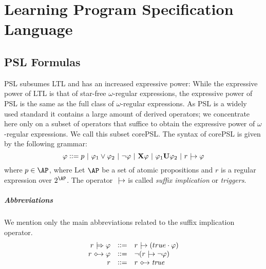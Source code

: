 \chapter{Learning Program Specification Language}

\section{PSL Formulas}
 
PSL subsumes LTL and has an increased expressive power: While the expressive power of LTL is that of star-free $\omega$-regular expressions, the expressive power of PSL is the same as the full class of $\omega$-regular expressions. As PSL is a widely used standard it contains a large amount of derived operators; we concentrate here only on a subset of operators that suffice to obtain the expressive power of $\omega$-regular expressions. We call this subset corePSL. The syntax of  corePSL is given by the following grammar: 
$$\varphi ::= p ~|~ \varphi_1 \vee \varphi_2 ~|~ \neg \varphi ~|~ \textbf{X} \varphi ~|~ \varphi_1 \textbf{U} \varphi_2 ~|~ r \ |\hspace{-1.8mm}\rightarrow \varphi$$
where $p\in \AP$, where Let $\AP$ be a set of atomic propositions and  $r$ is a regular expression over $2^\AP$. %
The operator $\ |\hspace{-1.8mm}\rightarrow$ is called \emph{suffix implication} or \emph{triggers}.
\paragraph{Abbreviations}
We mention only the main abbreviations related to the suffix implication operator.
\[
\begin{array}{rcl}
r \xtriggers \varphi &::= & r \triggers (true \cdot \varphi) \\ 
r \followedby \varphi &::= & \neg (r \triggers \neg \varphi) \\
r &::= & r \followedby \mathit{true}
\end{array}
\]

